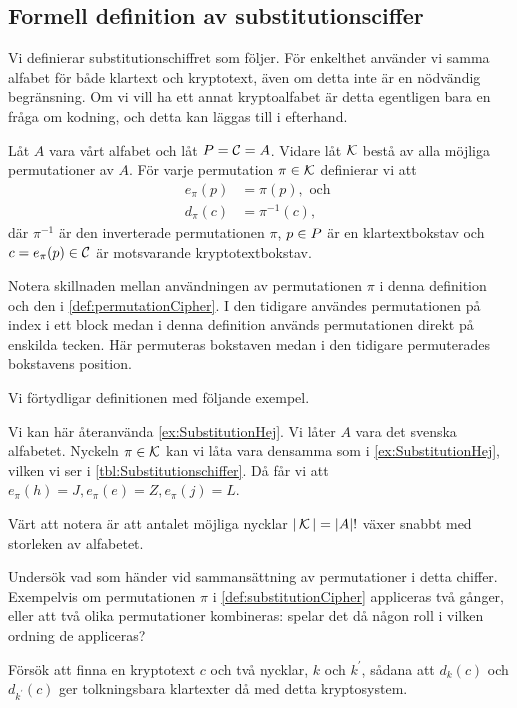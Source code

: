 \subsection{Formell definition av substitutionsciffer}
Vi definierar substitutionschiffret som följer.
För enkelthet använder vi samma alfabet för både klartext och kryptotext, även 
om detta inte är en nödvändig begränsning.
Om vi vill ha ett annat kryptoalfabet är detta egentligen bara en fråga om 
kodning, och detta kan läggas till i efterhand.
\begin{definition}[Substitutionschiffer]\label{def:substitutionCipher}
  Låt \(A\) vara vårt alfabet och låt \(\P = \C = A\).
  Vidare låt \(\operatorname{\mathcal{K}}\) bestå av alla möjliga permutationer av \(A\).
  För varje permutation \(\pi\in \operatorname{\mathcal{K}}\) definierar vi att
  \begin{align}
    \nonumber
    e_\pi(p) &= \pi(p), \text{\ och\ } \\
    \nonumber
    d_\pi(c) &= \pi^{-1}(c),
  \end{align}
  där \(\pi^{-1}\) är den inverterade permutationen \(\pi\), \(p\in \P\) är en 
  klartextbokstav och \(c = e_\pi(p)\in \operatorname{\mathcal{C}}\) är motsvarande kryptotextbokstav.
\end{definition}

Notera skillnaden mellan användningen av permutationen \(\pi\) i denna 
definition och den i \cref{def:permutationCipher}.
I den tidigare användes permutationen på index i ett block medan i denna 
definition används permutationen direkt på enskilda tecken.
Här permuteras bokstaven medan i den tidigare permuterades bokstavens position.

Vi förtydligar definitionen med följande exempel.
\begin{example}
  Vi kan här återanvända \cref{ex:SubstitutionHej}.
  Vi låter \(A\) vara det svenska alfabetet.
  Nyckeln \(\pi\in \operatorname{\mathcal{K}}\) kan vi låta vara densamma som 
  i \cref{ex:SubstitutionHej}, vilken vi ser 
  i \cref{tbl:Substitutionschiffer}.
  Då får vi att \(e_\pi(h) = J, e_\pi(e) = Z, e_\pi(j) = L\).
\end{example}

Värt att notera är att antalet möjliga nycklar \(|\operatorname{\mathcal{K}}| = {|A|!}\) växer snabbt 
med storleken av alfabetet.

\begin{exercise}
  Undersök vad som händer vid sammansättning av permutationer i detta chiffer.
  Exempelvis om permutationen \(\pi\) i \cref{def:substitutionCipher} 
  appliceras två gånger, eller att två olika permutationer kombineras: spelar 
  det då någon roll i vilken ordning de appliceras?
\end{exercise}
\begin{exercise}
  Försök att finna en kryptotext \(c\) och två nycklar, \(k\) och \(k^\prime\), 
  sådana att \(d_k(c)\) och \(d_{k^\prime}(c)\) ger tolkningsbara klartexter då 
  med detta kryptosystem.
\end{exercise}

